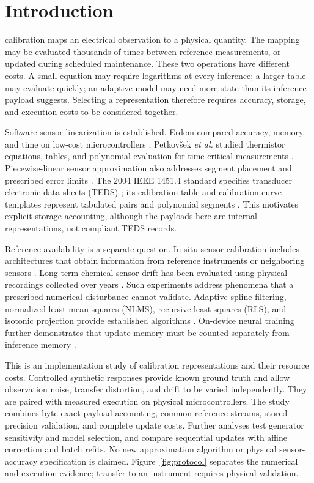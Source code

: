 \documentclass[journal,twoside,web]{ieeecolor}
\begin{document}
\section{Introduction}
 calibration maps an electrical observation to a physical quantity. The mapping may be evaluated thousands of times between reference measurements, or updated during scheduled maintenance. These two operations have different costs. A small equation may require logarithms at every inference; a larger table may evaluate quickly; an adaptive model may need more state than its inference payload suggests. Selecting a representation therefore requires accuracy, storage, and execution costs to be considered together.

Software sensor linearization is established. Erdem compared accuracy, memory, and time on low-cost microcontrollers \cite{erdem}; Petkov\v{s}ek \emph{et al.} studied thermistor equations, tables, and polynomial evaluation for time-critical measurements \cite{petkovsek}. Piecewise-linear sensor approximation also addresses segment placement and prescribed error limits \cite{marinov}. The 2004 IEEE 1451.4 standard specifies transducer electronic data sheets (TEDS) \cite{teds}; its calibration-table and calibration-curve templates represent tabulated pairs and polynomial segments \cite{ni}. This motivates explicit storage accounting, although the payloads here are internal representations, not compliant TEDS records.

Reference availability is a separate question. In situ sensor calibration includes architectures that obtain information from reference instruments or neighboring sensors \cite{delaine}. Long-term chemical-sensor drift has been evaluated using physical recordings collected over years \cite{vergara}. Such experiments address phenomena that a prescribed numerical disturbance cannot validate. Adaptive spline filtering, normalized least mean squares (NLMS), recursive least squares (RLS), and isotonic projection provide established algorithms \cite{scarpiniti,haykin,pava}. On-device neural training further demonstrates that update memory must be counted separately from inference memory \cite{tinytrain}.

This is an implementation study of calibration representations and their resource costs. Controlled synthetic responses provide known ground truth and allow observation noise, transfer distortion, and drift to be varied independently. They are paired with measured execution on physical microcontrollers. The study combines byte-exact payload accounting, common reference streams, stored-precision validation, and complete update costs. Further analyses test generator sensitivity and model selection, and compare sequential updates with affine correction and batch refits. No new approximation algorithm or physical sensor-accuracy specification is claimed. Figure~\ref{fig:protocol} separates the numerical and execution evidence; transfer to an instrument requires physical validation.
\end{document}
